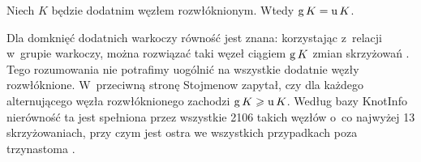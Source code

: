 \begin{conjecture}
%
%
%
    Niech $K$ będzie dodatnim węzłem rozwłóknionym.
    Wtedy $\operatorname{g} K = \operatorname{u} K$.
\end{conjecture}

Dla domknięć dodatnich warkoczy równość jest znana: korzystając z~relacji w~grupie warkoczy, można rozwiązać taki węzeł ciągiem $\operatorname{g} K$ zmian skrzyżowań \cite{boileau1984}.
%
%
Tego rozumowania nie potrafimy uogólnić na wszystkie dodatnie węzły rozwłóknione.
W~przeciwną stronę Stojmenow zapytał, czy dla każdego alternującego węzła rozwłóknionego zachodzi $\operatorname{g} K \geqslant \operatorname{u} K$.
%
Według bazy KnotInfo \cite{knotinfo2024} nierówność ta jest spełniona przez wszystkie 2106 takich węzłów o~co najwyżej 13 skrzyżowaniach, przy czym jest ostra we wszystkich przypadkach poza trzynastoma \cite[problem 1.5]{baykur2026}.
